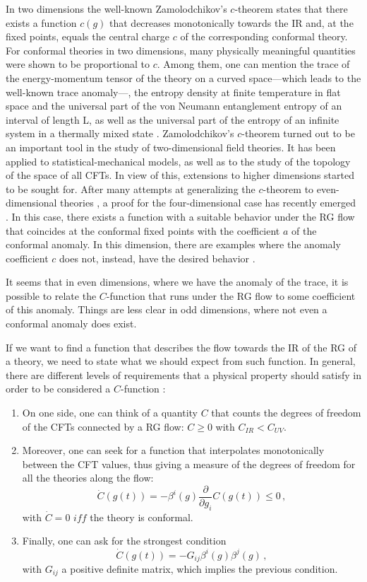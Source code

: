 \documentclass[12pt,a4paper]{article}
\numberwithin{equation}{section}
\begin{document}
In two dimensions the well-known Zamolodchikov's $c$-theorem \cite{zam} states that there exists a function $c(g)$ that decreases monotonically towards the IR and, at the fixed points, equals the central charge $c$ of the corresponding conformal theory. For conformal theories in two dimensions, many physically meaningful quantities were shown to be proportional to $c$. Among them, one can mention the trace of the energy-momentum tensor of the theory on a curved space---which leads to the well-known trace anomaly---, the entropy density at finite temperature in flat space and the universal part of the von Neumann entanglement entropy of an interval of length L, as well as the universal part of the entropy of an infinite system in a thermally mixed state \cite{cardy}.  %
Zamolodchikov's $c$-theorem turned out to be an important tool in the study of two-dimensional field theories. It has been applied to statistical-mechanical models, as well as to the study of the topology of the space of all CFTs. In view of this, extensions to higher dimensions started to be sought for. After many attempts at generalizing the $c$-theorem to even-dimensional theories \cite{cardy4, osborn, osborn-jack}, a proof for the four-dimensional case has recently emerged \cite{KS,K}.  In this case, there exists a function with a suitable behavior under the RG flow that coincides at the conformal fixed points with the coefficient $a$ of the conformal anomaly. In this dimension, there are examples where the anomaly coefficient $c$ does not, instead, have the desired behavior \cite{Cappelli:1990yc,Anselmi:1997am}.

It seems that in even dimensions, where we have the anomaly of the trace, it is possible to relate the $\textit{C}$-function that runs under the RG flow to some coefficient of this anomaly.
%
Things are less clear in odd dimensions, where not even a conformal anomaly does exist.

If we want to find a function that describes the flow towards the IR of the RG of a theory, we need to state what we should expect from such function. In general, there are different levels of requirements that a physical property should satisfy in order to be considered a $\textit{C}$-function \cite{Barnes2004}:

\begin{enumerate}
	\item On one side, one can think of a quantity $C$ that counts the degrees of freedom of the CFTs connected by a RG flow: $C\geq 0$ with $C_{IR}<C_{UV}$. \label{r1}
	\item Moreover, one can seek for a function that interpolates monotonically between the CFT values, thus giving a measure of the degrees of freedom for all the theories along the flow:
	\[\dot{C}(g(t)) = -\beta^{i}(g)\frac{\partial}{\partial {g}_i}C(g(t))\leq 0\,,\] with $\dot{C}= 0$ $iff$ the theory is conformal. \label{r2}
	\item Finally, one can ask for the strongest condition \[\dot{C}(g(t)) = -G_{ij}\beta^{i}(g)\beta^{j}(g)\,,\] with $G_{ij}$ a positive definite matrix, which implies the previous condition. \label{r3}
\end{enumerate}
\end{document}
